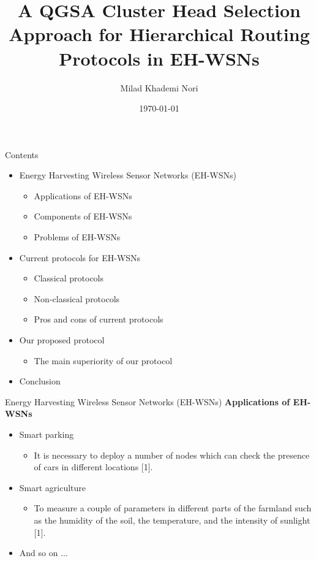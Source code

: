 \documentclass{beamer}
\title[Reinforcement Learning]{A QGSA Cluster Head Selection Approach for Hierarchical Routing Protocols in EH-WSNs}
\author{Milad Khademi Nori}
\institute{ICSPIS Conference at Amirkabir University of Technology}
\date{\today}
\begin{document}
\begin{frame}
\titlepage
\end{frame}


\begin{frame}[t]{Contents} %
\begin{itemize}
\item Energy Harvesting Wireless Sensor Networks (EH-WSNs)
		\begin{itemize}
		\item Applications of EH-WSNs 
		\item Components of EH-WSNs
		\item Problems of EH-WSNs
		\end{itemize}		
\item Current protocols for EH-WSNs
		\begin{itemize}		
		\item Classical protocols
		\item Non-classical protocols
		\item Pros and cons of current protocols
		\end{itemize}		
\item Our proposed protocol
		\begin{itemize}
		\item The main superiority of our protocol
		\end{itemize}
\item Conclusion
\end{itemize}
\end{frame}


\begin{frame}[t]{Energy Harvesting Wireless Sensor Networks (EH-WSNs)} %
\textbf{Applications of EH-WSNs}
\begin{itemize}
\item Smart parking
	\begin{itemize}
	\justifying
	\item It is necessary to deploy a number of nodes which can check the presence of cars in different locations [1].
	\end{itemize}
\item Smart agriculture
	\begin{itemize}
	\justifying
	\item To measure a couple of parameters in different parts of the farmland such as the humidity of the soil, the temperature, and the intensity of sunlight [1].
	\end{itemize}
\item And so on ...
\end{itemize}
\end{frame}
\end{document}
